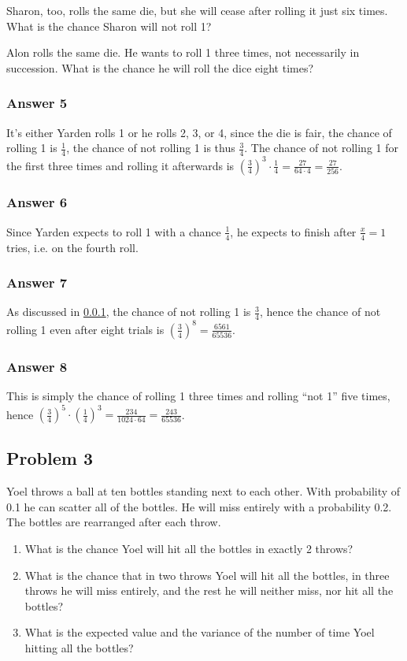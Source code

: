 \documentclass[11pt]{article}
\begin{document}
Sharon, too, rolls the same die, but she will cease after rolling it just
six times.  What is the chance Sharon will not roll 1?

Alon rolls the same die.  He wants to roll 1 three times, not necessarily
in succession.  What is the chance he will roll the dice eight times?

\subsubsection{Answer 5}
\label{sec:orgheadline6}
It's either Yarden rolls 1 or he rolls 2, 3, or 4, since the die is fair,
the chance of rolling 1 is \(\frac{1}{4}\), the chance of not rolling 1 is
thus \(\frac{3}{4}\).  The chance of not rolling 1 for the first three times
and rolling it afterwards is \(\left(\frac{3}{4}\right)^3 \cdot \frac{1}{4} =
    \frac{27}{64 \cdot 4} = \frac{27}{256}\).

\subsubsection{Answer 6}
\label{sec:orgheadline7}
Since Yarden expects to roll 1 with a chance \(\frac{1}{4}\), he expects to
finish after \(\frac{x}{4}=1\) tries, i.e. on the fourth roll.

\subsubsection{Answer 7}
\label{sec:orgheadline8}
As discussed in \ref{sec:orgheadline6}, the chance of not rolling 1 is \(\frac{3}{4}\),
hence the chance of not rolling 1 even after eight trials is
\(\left(\frac{3}{4}\right)^8 = \frac{6561}{65536}\).

\subsubsection{Answer 8}
\label{sec:orgheadline9}
This is simply the chance of rolling 1 three times and rolling ``not 1''
five times, hence \(\left(\frac{3}{4}\right)^5 \cdot
    \left(\frac{1}{4}\right)^3 = \frac{234}{1024 \cdot 64} = \frac{243}{65536}\).

\subsection{Problem 3}
\label{sec:orgheadline14}
Yoel throws a ball at ten bottles standing next to each other.  With
probability of 0.1 he can scatter all of the bottles.  He will miss entirely
with a probability 0.2.  The bottles are rearranged after each throw.
\begin{enumerate}
\item What is the chance Yoel will hit all the bottles in exactly 2 throws?
\item What is the chance that in two throws Yoel will hit all the bottles,
in three throws he will miss entirely, and the rest he will neither
miss, nor hit all the bottles?
\item What is the expected value and the variance of the number of time Yoel
hitting all the bottles?
\end{enumerate}
\end{document}
